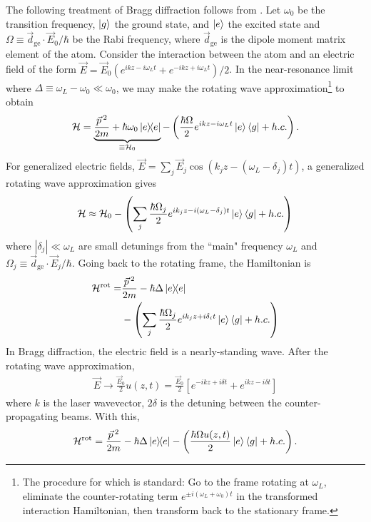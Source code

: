 \documentclass[reprint,
nofootinbib,
amsmath,amssymb,
aps]{revtex4-1}
\newcommand{\f}[2]{\frac{#1}{#2}}
\newcommand{\lp}{\left(}
\newcommand{\rp}{\right)}
\newcommand{\lb}{\left[}
\newcommand{\rb}{\right]}
\begin{document}
The following treatment of Bragg diffraction follows from \cite{estey2016precision}. Let $\omega_0$ be the transition frequency, $\ket{g}$  the ground state, and $\ket{e}$  the excited state and $\Omega \equiv \vec{d}_\text{ge}\cdot \vec{E}_0/\hbar$ be the Rabi frequency, where $\vec{d}_\text{ge}$ is the dipole moment matrix element of the atom. Consider the interaction between the atom and an electric field of the form $\vec{E} = \vec{E}_0(e^{ikz - i \omega_Lt} + e^{-ikz+i\omega_Lt}) /2 $.  In the near-resonance limit where $\Delta \equiv \omega_L - \omega_0 \ll \omega_0$, we may make the rotating wave approximation\footnote{The procedure for which is standard: Go to the frame rotating at $\omega_L$, eliminate the counter-rotating term $e^{\pm i(\omega_L+\omega_0)t}$ in the transformed interaction Hamiltonian, then transform back to the stationary frame.} to obtain 
\begin{align*}
\mathcal{H} = \underbrace{\f{\vec{p}\,^2}{2m} + \hbar \omega_0 \ketbra{e}}_{\equiv\mathcal{H}_0} - \lp \f{\hbar\Omega}{2}e^{ikz - i\omega_Lt} \ket{e}\bra{g} + h.c.\rp.
\end{align*}
For generalized electric fields, $\vec{E} = \sum_j \vec{E}_j \cos(k_j z - (\omega_L - \delta_j)t)$, a generalized rotating wave approximation gives
\begin{align*}
\mathcal{H} \approx \mathcal{H}_0 -  \lp \sum_j \f{\hbar\Omega_j}{2} e^{ik_j z - i(\omega_L - \delta_j) t} \ket{e}\bra{g} + h.c. \rp
\end{align*}
where $|\delta_j|\ll \omega_L$ are small detunings from the ``main" frequency $\omega_L$ and $\Omega_j \equiv \vec{d}_\text{ge}\cdot \vec{E}_j / \hbar$. Going back to the rotating frame, the Hamiltonian is 
\begin{align*}
\mathcal{H}^\text{rot} = &\f{\vec{p}\,^2}{2m} - \hbar \Delta \ketbra{e} \\
&- \lp \sum_j \f{\hbar \Omega_j}{2} e^{ik_jz + i \delta_i t} \ket{e}\bra{g} + h.c. \rp
\end{align*}
In Bragg diffraction, the electric field is a nearly-standing wave. After the rotating wave approximation, 
\begin{align*}
\vec{E} \to \f{\vec{E}_0}{2}u(z,t) = \f{\vec{E}_0}{2} \lb  e^{-ikz + i\delta t} + e^{ikz-i\delta t}\rb
\end{align*}
where $k$ is the laser wavevector, $2\delta$ is the detuning between the counter-propagating beams. With this, 
\begin{align*}
\mathcal{H}^\text{rot} = \f{\vec{p}\,^2}{2m} -\hbar \Delta  \ketbra{e} -\lp \f{\hbar\Omega u(z,t)}{2}\ket{e}\bra{g} + h.c.\rp.
\end{align*}
\end{document}
